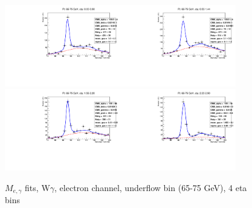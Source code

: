 \begin{figure}[htb]
  \begin{center}
   \includegraphics[width=0.45\textwidth]{../figs/figs_v11/ELECTRON_WGamma/EtoGammaFits/sa_hZmass_h_Data_EtoGamma_Enr_BARREL_pt65to75_ieta0_noWMtCut.pdf}\includegraphics[width=0.45\textwidth]{../figs/figs_v11/ELECTRON_WGamma/EtoGammaFits/sa_hZmass_h_Data_EtoGamma_Enr_BARREL_pt65to75_ieta1_noWMtCut.pdf}\\
   \includegraphics[width=0.45\textwidth]{../figs/figs_v11/ELECTRON_WGamma/EtoGammaFits/sa_hZmass_h_Data_EtoGamma_Enr_ENDCAP_pt65to75_ieta0_noWMtCut.pdf}\includegraphics[width=0.45\textwidth]{../figs/figs_v11/ELECTRON_WGamma/EtoGammaFits/sa_hZmass_h_Data_EtoGamma_Enr_ENDCAP_pt65to75_ieta1_noWMtCut.pdf}\\
  \label{fig:etogFits_65to75}
  \caption{$M_{e,\gamma}$ fits, W$\gamma$, electron channel, underflow bin (65-75 GeV), 4 eta bins}
  \end{center}
\end{figure}


